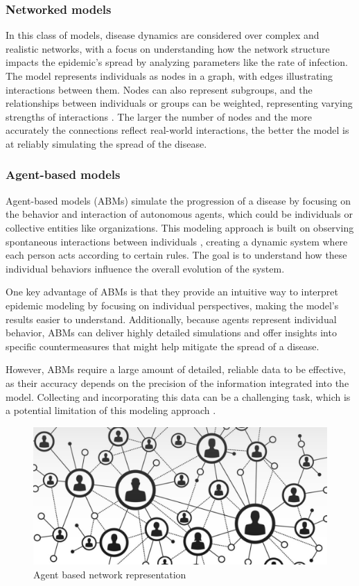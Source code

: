 \subsubsection{Networked models}
In this class of models, disease dynamics are considered over complex and realistic networks, with a focus on understanding how the network structure impacts the epidemic's spread by analyzing parameters like the rate of infection. The model represents individuals as nodes in a graph, with edges illustrating interactions between them. Nodes can also represent subgroups, and the relationships between individuals or groups can be weighted, representing varying strengths of interactions \cite{Newman2002,VanMieghem2009}. The larger the number of nodes and the more accurately the connections reflect real-world interactions, the better the model is at reliably simulating the spread of the disease.


\subsubsection{Agent-based models}
Agent-based models (ABMs) simulate the progression of a disease by focusing on the behavior and interaction of autonomous agents, which could be individuals or collective entities like organizations. This modeling approach is built on observing spontaneous interactions between individuals \cite{Tizzoni2014}, creating a dynamic system where each person acts according to certain rules. The goal is to understand how these individual behaviors influence the overall evolution of the system.

One key advantage of ABMs is that they provide an intuitive way to interpret epidemic modeling by focusing on individual perspectives, making the model's results easier to understand. Additionally, because agents represent individual behavior, ABMs can deliver highly detailed simulations and offer insights into specific countermeasures that might help mitigate the spread of a disease.

However, ABMs require a large amount of detailed, reliable data to be effective, as their accuracy depends on the precision of the information integrated into the model. Collecting and incorporating this data can be a challenging task, which is a potential limitation of this modeling approach \cite{Hernandez_Vargas_2022}.
\begin{figure}
	\centering
	\includegraphics[width=0.5\linewidth]{0_introduction/images_introduction/agent_based}
	\caption[Agent based network representation]{Agent based network representation}
	\label{fig:agentbased}
\end{figure}

